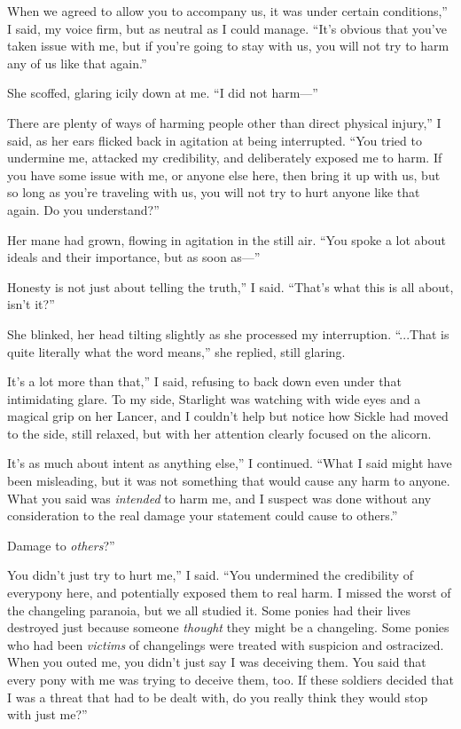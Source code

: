 \leavevmode{}When we agreed to allow you to accompany us, it was under certain conditions,” I said, my voice firm, but as neutral as I could manage. “It’s obvious that you’ve taken issue with me, but if you’re going to stay with us, you will not try to harm any of us like that again.”

She scoffed, glaring icily down at me. “I did not harm—”

\leavevmode{}There are plenty of ways of harming people other than direct physical injury,” I said, as her ears flicked back in agitation at being interrupted. “You tried to undermine me, attacked my credibility, and deliberately exposed me to harm. If you have some issue with me, or anyone else here, then bring it up with us, but so long as you’re traveling with us, you will not try to hurt anyone like that again. Do you understand?”

Her mane had grown, flowing in agitation in the still air. “You spoke a lot about ideals and their importance, but as soon as—”

\leavevmode{}Honesty is not just about telling the truth,” I said. “That’s what this is all about, isn’t it?”

She blinked, her head tilting slightly as she processed my interruption. “...That is quite literally what the word means,” she replied, still glaring.

\leavevmode{}It’s a lot more than that,” I said, refusing to back down even under that intimidating glare. To my side, Starlight was watching with wide eyes and a magical grip on her Lancer, and I couldn’t help but notice how Sickle had moved to the side, still relaxed, but with her attention clearly focused on the alicorn.

\leavevmode{}It’s as much about intent as anything else,” I continued. “What I said might have been misleading, but it was not something that would cause any harm to anyone. What you said was \textit{intended} to harm me, and I suspect was done without any consideration to the real damage your statement could cause to others.”

\leavevmode{}Damage to \textit{others}?”

\leavevmode{}You didn’t just try to hurt me,” I said. “You undermined the credibility of everypony here, and potentially exposed them to real harm. I missed the worst of the changeling paranoia, but we all studied it. Some ponies had their lives destroyed just because someone \textit{thought} they might be a changeling. Some ponies who had been \textit{victims} of changelings were treated with suspicion and ostracized. When you outed me, you didn’t just say I was deceiving them. You said that every pony with me was trying to deceive them, too. If these soldiers decided that I was a threat that had to be dealt with, do you really think they would stop with just me?”

